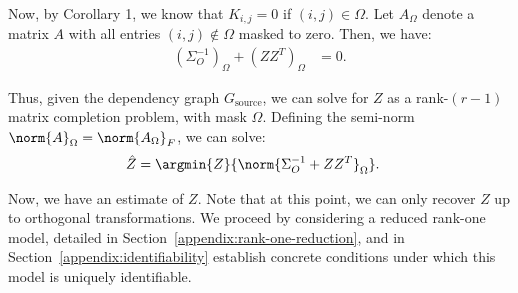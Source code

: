 \documentclass[letterpaper]{article}
\begin{document}
\begin{appendix}
Now, by Corollary 1, we know that $K_{i,j} = 0$ if $(i,j) \in \Omega$.
Let $A_\Omega$ denote a matrix $A$ with all entries $(i,j) \notin \Omega$ masked to zero.
Then, we have:
\begin{align}
	\left( \Sigma_O^{-1} \right)_\Omega + \left( ZZ^T \right)_\Omega &= 0.
\end{align}

Thus, given the dependency graph $G_{\text{source}}$, we can solve for $Z$ as a rank-$(r-1)$ matrix completion problem, with mask $\Omega$.
Defining the semi-norm $\norm{ A }_\Omega = \norm{ A_\Omega }_F$, we can solve:
\begin{align}
	\hat{Z}
	&=
	\argmin{Z}{ \norm{ \Sigma_O^{-1} + Z Z^T }_\Omega }.
\end{align}

Now, we have an estimate of $Z$.
Note that at this point, we can only recover $Z$ up to orthogonal transformations.
We proceed by considering a reduced rank-one model, detailed in Section~\ref{appendix:rank-one-reduction}, and in Section~\ref{appendix:identifiability} establish concrete conditions under which this model is uniquely identifiable.


\end{appendix}
\end{document}

